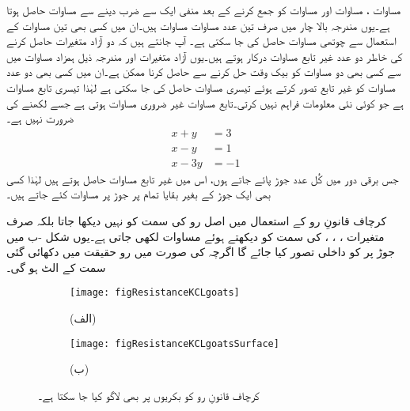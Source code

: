 مساوات ، مساوات  اور مساوات  کو جمع کرنے کے بعد منفی ایک  سے ضرب دینے سے مساوات  حاصل ہوتا ہے۔یوں مندرجہ بالا چار  میں صرف تین عدد مساوات  مساوات ہیں۔ان میں کسی بھی تین مساوات کے استعمال سے چوتھی مساوات حاصل کی جا سکتی ہے۔ آپ جانتے ہیں کہ دو آزاد متغیرات حاصل کرنے کی خاطر دو عدد غیر تابع مساوات درکار ہوتے ہیں۔یوں آزاد متغیرات  اور  مندرجہ ذیل ہمزاد مساوات  میں سے کسی بھی دو مساوات کو بیک وقت حل کرنے سے حاصل کرنا ممکن ہے۔ان میں کسی بھی دو عدد مساوات کو غیر تابع تصور کرتے ہوئے تیسری مساوات حاصل کی جا سکتی ہے لہٰذا تیسری تابع مساوات ہے جو کوئی نئی معلومات فراہم نہیں کرتی۔تابع مساوات غیر ضروری مساوات ہوتی ہے جسے لکھنے کی ضرورت نہیں ہے۔
\begin{align*}
x+y&=3\\
x-y&=1\\
x-3y&=-1
\end{align*}
جس برقی دور میں کُل  عدد جوڑ پائے جاتے ہوں، اس میں  غیر تابع مساوات حاصل ہوتے ہیں لہٰذا کسی بھی ایک جوڑ کے بغیر بقایا تمام پر جوڑ پر مساوات کئے جاتے ہیں۔


کرچاف قانونِ رو کے استعمال میں اصل رو کی سمت کو نہیں دیکھا جاتا بلکہ صرف متغیرات ، ، ،  کی سمت کو دیکھتے ہوئے مساوات لکھی جاتی ہے۔یوں شکل -ب میں جوڑ  پر  کو داخلی تصور کیا جائے گا اگرچہ  کی صورت میں رو حقیقت میں دکھائی گئی سمت کے الٹ ہو گی۔

\begin{figure}
\centering
\begin{subfigure}{0.4\textwidth}
\centering
\texttt{[image: figResistanceKCLgoats]}
\caption*{(الف)}
\end{subfigure}%
%
\begin{subfigure}{0.4\textwidth}
\centering
\texttt{[image: figResistanceKCLgoatsSurface]}
\caption*{(ب)}
\end{subfigure}%
\caption{کرچاف قانونِ رو کو بکریوں پر بھی لاگو کیا جا سکتا ہے۔}
\label{شکل_مزاحمتی_بکریاں_اور_کرچاف_قانون_رو}
\end{figure}

